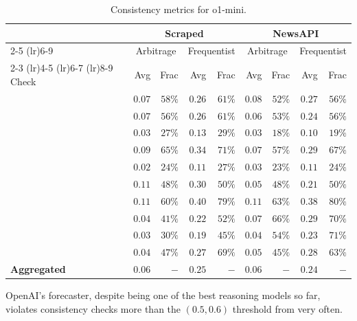 \begin{table}[htbp]
\centering
  \caption{Consistency metrics for o1-mini.}
  \label{tab:o1-mini}
  \small
  \begin{tabular}{@{} lrrrrrrrr @{}}
    \toprule
    & \multicolumn{4}{c}{Scraped} & \multicolumn{4}{c}{NewsAPI} \\
    \cmidrule(lr){2-5} \cmidrule(lr){6-9}
    & \multicolumn{2}{c}{Arbitrage} & \multicolumn{2}{c}{Frequentist} & \multicolumn{2}{c}{Arbitrage} & \multicolumn{2}{c}{Frequentist} \\
    \cmidrule(lr){2-3} \cmidrule(lr){4-5} \cmidrule(lr){6-7} \cmidrule(lr){8-9}
    Check & Avg & Frac & Avg & Frac & Avg & Frac & Avg & Frac \\
    \midrule
    \NegChecker{} & $0.07$ & $58\%$ & $0.26$ & $61\%$ & $0.08$ & $52\%$ & $0.27$ & $56\%$ \\
    \ParaphraseChecker{} & $0.07$ & $56\%$ & $0.26$ & $61\%$ & $0.06$ & $53\%$ & $0.24$ & $56\%$ \\
    \ConsequenceChecker{} & $0.03$ & $27\%$ & $0.13$ & $29\%$ & $0.03$ & $18\%$ & $0.10$ & $19\%$ \\
    \AndOrChecker{} & $0.09$ & $65\%$ & $0.34$ & $71\%$ & $0.07$ & $57\%$ & $0.29$ & $67\%$ \\
    \AndChecker{} & $0.02$ & $24\%$ & $0.11$ & $27\%$ & $0.03$ & $23\%$ & $0.11$ & $24\%$ \\
    \OrChecker{} & $0.11$ & $48\%$ & $0.30$ & $50\%$ & $0.05$ & $48\%$ & $0.21$ & $50\%$ \\
    \ButChecker{} & $0.11$ & $60\%$ & $0.40$ & $79\%$ & $0.11$ & $63\%$ & $0.38$ & $80\%$ \\
    \CondChecker{} & $0.04$ & $41\%$ & $0.22$ & $52\%$ & $0.07$ & $66\%$ & $0.29$ & $70\%$ \\
    \CondCondChecker{} & $0.03$ & $30\%$ & $0.19$ & $45\%$ & $0.04$ & $54\%$ & $0.23$ & $71\%$ \\
    \ExpectedEvidenceChecker{} & $0.04$ & $47\%$ & $0.27$ & $69\%$ & $0.05$ & $45\%$ & $0.28$ & $63\%$ \\
    \midrule
    \textbf{Aggregated} & $0.06$ & $-$ & $0.25$ & $-$ & $0.06$ & $-$ & $0.24$ & $-$ \\
    \bottomrule
  \end{tabular}
\end{table}
OpenAI's \oonemini{} forecaster, despite being one of the best reasoning models so far, violates consistency checks more than the $(0.5, 0.6)$ threshold from  very often.

